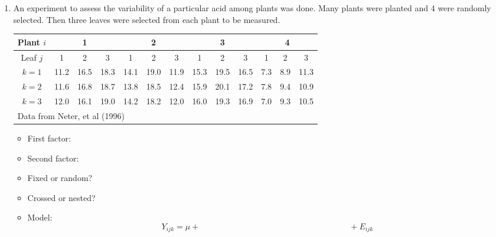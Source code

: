 \begin{enumerate}
\item An experiment to assess the variability of a particular acid among plants was done.  Many plants were planted and 4 were randomly selected.  Then three leaves were selected from each plant to be measured.
\begin{large}
\begin{center}
\begin{tabular}{c|ccc|ccc|ccc|ccc}
Plant $i$ & \multicolumn{3}{c}{1} & \multicolumn{3}{c}{2} & \multicolumn{3}{c}{3} & \multicolumn{3}{c}{4}  \\ \hline
Leaf $j$ & 1 & 2 & 3 & 1 & 2 & 3 & 1 & 2 & 3 & 1 & 2 & 3 \\ \hline
$k=1$ & 11.2 & 16.5 & 18.3 & 14.1 & 19.0 & 11.9 & 15.3 & 19.5 & 16.5 & 7.3 & 8.9 & 11.3 \\
$k=2$ & 11.6 & 16.8 & 18.7 & 13.8 & 18.5 & 12.4 & 15.9 & 20.1 & 17.2 & 7.8 & 9.4 & 10.9 \\
$k=3$ & 12.0 & 16.1 & 19.0 & 14.2 & 18.2 & 12.0 & 16.0 & 19.3 & 16.9 & 7.0 & 9.3 & 10.5 \\ \hline
\multicolumn{12}{l}{Data from Neter, et al (1996)}
\end{tabular}
\end{center}
\end{large}

\begin{itemize}
\item First factor:
\item Second factor:
\item Fixed or random?
\item Crossed or nested?
\item Model:  
$$Y_{ijk} = \mu + \hspace{3in} + E_{ijk}$$
\end{itemize}



\end{enumerate}
